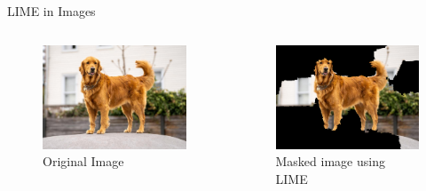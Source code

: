 \documentclass[final]{beamer}
\newlength{\colwidth}
\begin{document}
\begin{frame}[t]
\begin{columns}[t]
\begin{column}{\colwidth}
\begin{block}{LIME in Images}
    \begin{columns}
      \begin{column}{0.2\textwidth}
        \begin{figure}
          \centering
          \includegraphics[width=0.85\linewidth]{images/dog.jpeg}
          \caption{Original Image}
        \end{figure} 
      \end{column}

      \begin{column}{0.2\textwidth}
        \begin{figure}
          \centering
          \includegraphics[width=0.85\linewidth]{images/lime.png}
          \caption{Masked image using LIME}
        \end{figure}
      \end{column}

    \end{columns}


  \end{block}


\end{column}
\end{columns}
\end{frame}
\end{document}
